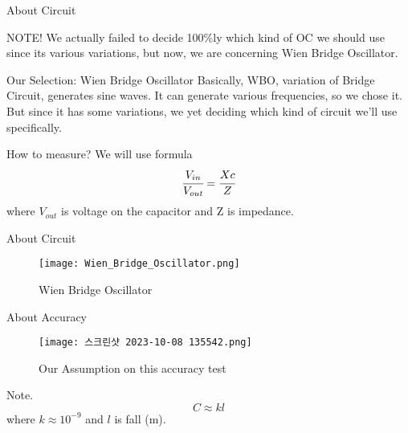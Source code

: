 \documentclass{beamer}
\begin{document}
\begin{frame}{About Circuit}
    \begin{block}{NOTE!}
        We actually failed to decide 100\%ly which kind of OC we should use since its various variations, but now, we are concerning Wien Bridge Oscillator.
    \end{block}
    \begin{block}{Our Selection: Wien Bridge Oscillator}
        Basically, WBO, variation of Bridge Circuit, generates sine waves. It can generate various frequencies, so we chose it. But since it has some variations, we yet deciding which kind of circuit we'll use specifically.
    \end{block}
    \begin{block}{How to measure?}
        We will use formula
        \begin{equation}
            \nonumber\cfrac{V_{in}}{V_{out}}=\cfrac{Xc}{Z}
        \end{equation}
        where $V_{out}$ is voltage on the capacitor and Z is impedance.
    \end{block}
\end{frame}

\begin{frame}{About Circuit}
    \begin{figure}
        \centering
        \texttt{[image: Wien\_Bridge\_Oscillator.png]}
        \caption{Wien Bridge Oscillator}
        \label{fig:enter-label}
    \end{figure}
\end{frame}

\begin{frame}{About Accuracy}
    \begin{figure}
        \centering
        \texttt{[image: 스크린샷 2023-10-08 135542.png]}
        \caption{Our Assumption on this accuracy test}
        \label{Our Assumption on this accuracy test}
    \end{figure}
    \begin{block}{Note.}
        \begin{equation}
            \nonumber C\approx kl
        \end{equation}
        where $k\approx10^{-9}$ and $l$ is fall (m).
    \end{block}
\end{frame}
\end{document}
